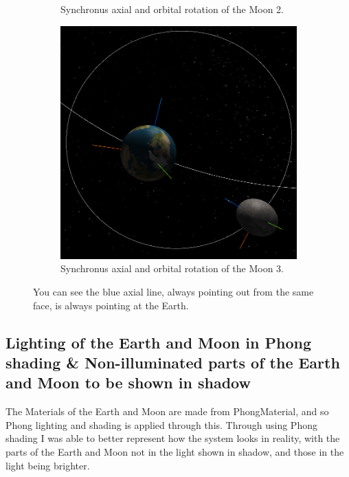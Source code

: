 \documentclass[12pt]{article}
\begin{document}
\begin{figure}[H]
\begin{subfigure}[b]{0.4\textwidth}
                \caption{Synchronus axial and orbital rotation of the Moon 2.}
                \label{fig: Synchronus axial and orbital rotation of the Moon.}
	 \end{subfigure}
	 \begin{subfigure}[b]{0.4\textwidth}
                \includegraphics[width=\textwidth]{images/syncrotation3}
                \caption{Synchronus axial and orbital rotation of the Moon 3.}
                \label{fig: Synchronus axial and orbital rotation of the Moon.}
	 \end{subfigure}
	 \caption{You can see the blue axial line, always pointing out from the same face, is always pointing at the Earth.}
\end{figure}



\subsection{Lighting of the Earth and Moon in Phong shading \& Non-illuminated parts of the Earth and Moon to be shown in shadow}
The Materials of the Earth and Moon are made from PhongMaterial, and so Phong lighting and shading is applied through this. Through using Phong shading I was able to better represent how the system looks in reality, with the parts of the Earth and Moon not in the light shown in shadow, and those in the light being brighter.
\end{document}
